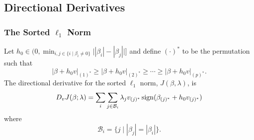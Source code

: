 \subsection{Directional Derivatives}%
\label{sec:directional-derivatives}
\subsubsection{The Sorted \texorpdfstring{\(\ell_1\)}{l1}
  Norm}

\begin{theorem}
  \label{thm:sl1-directional-derivative}
  Let \(h_0 \in \big(0, \min_{i,j \in \{i \mid \beta_i \neq 0\}}\big| |\beta_i| -
  |\beta_j| \big| \big]\) and define \((\cdot)^*\) to be the
  permutation such that
  \[
    |\beta + h_0v|_{(1)^*} \geq |\beta + h_0v |_{(2)^*}
    \geq \cdots \geq |\beta + h_0v|_{(p)^*}.
  \]
  The directional derivative for the sorted \(\ell_1\) norm, \(J(\beta,
  \lambda)\), is
  \[
    D_v J(\beta ; \lambda) =
    \sum_i \sum_{j \in \mathcal{B}_i} \lambda_j v_{(j)^*}\operatorname{sign}(\beta_{(j)^*} + h_0v_{(j)^*})\]
  where
  \[
    \mathcal{B}_i = \{j \mid |\beta_j| = |\beta_i|\}.
  \]
\end{theorem}
